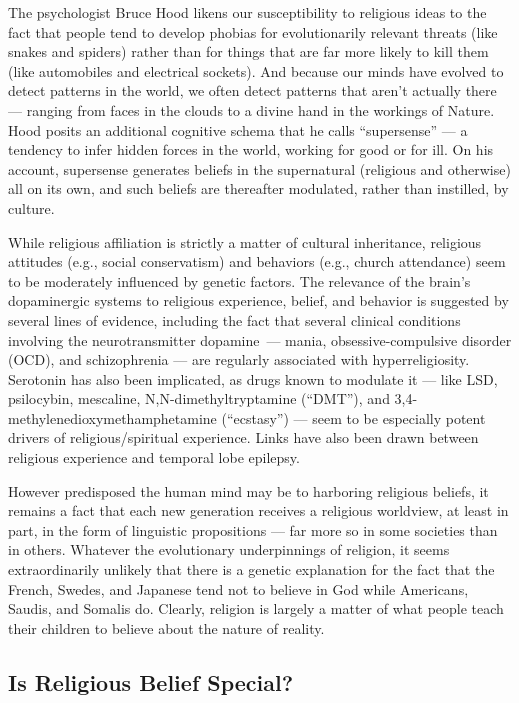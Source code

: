 \documentclass[a4paper,14pt]{extarticle}
\begin{document}
The psychologist Bruce Hood likens our susceptibility to religious ideas to the fact that people tend to develop phobias for evolutionarily relevant threats (like snakes and spiders) rather than for things that are far more likely to kill them (like automobiles and electrical sockets).
And because our minds have evolved to detect patterns in the world, we often detect patterns that aren’t actually there --- ranging from faces in the clouds to a divine hand in the workings of Nature.
Hood posits an additional cognitive schema that he calls ``supersense'' --- a tendency to infer hidden forces in the world, working for good or for ill.
On his account, supersense generates beliefs in the supernatural (religious and otherwise) all on its own, and such beliefs are thereafter modulated, rather than instilled, by culture.

While religious affiliation is strictly a matter of cultural inheritance, religious attitudes (e.g., social conservatism) and behaviors (e.g., church attendance) seem to be moderately influenced by genetic factors.
The relevance of the brain’s dopaminergic systems to religious experience, belief, and behavior is suggested by several lines of evidence, including the fact that several clinical conditions involving the neurotransmitter dopamine\ --- mania, obsessive-compulsive disorder (OCD), and schizophrenia --- are regularly associated with hyperreligiosity.
Serotonin has also been implicated, as drugs known to modulate it --- like LSD, psilocybin, mescaline, N,N-dimethyltryptamine (``DMT''), and 3,4-methylenedioxymethamphetamine (``ecstasy'') --- seem to be especially potent drivers of religious/spiritual experience.
Links have also been drawn between religious experience and temporal lobe epilepsy.

However predisposed the human mind may be to harboring religious beliefs, it remains a fact that each new generation receives a religious worldview, at least in part, in the form of linguistic propositions --- far more so in some societies than in others.
Whatever the evolutionary underpinnings of religion, it seems extraordinarily unlikely that there is a genetic explanation for the fact that the French, Swedes, and Japanese tend not to believe in God while Americans, Saudis, and Somalis do.
Clearly, religion is largely a matter of what people teach their children to believe about the nature of reality.

\subsection{Is Religious Belief Special?}
\end{document}
